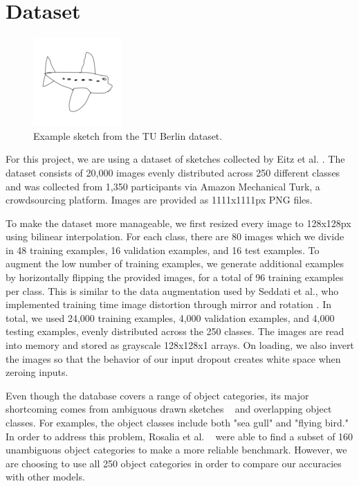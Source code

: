 \documentclass[10pt,twocolumn,letterpaper]{article}
\begin{document}
\section{Dataset}
\begin{figure}[h]
	\begin{center}
	\includegraphics[width=0.5\linewidth]{airplane}
	\caption{Example sketch from the TU Berlin dataset.}
	\end{center}
\end{figure}

For this project, we are using a dataset of sketches collected by Eitz et al. \cite{eitz2012hdhso}. The dataset consists of 20,000 images evenly distributed across 250 different classes and was collected from 1,350 participants via Amazon Mechanical Turk, a crowdsourcing platform. Images are provided as 1111x1111px PNG files.

To make the dataset more manageable, we first resized every image to 128x128px using bilinear interpolation. For each class, there are 80 images which we divide in 48 training examples, 16 validation examples, and 16 test examples. To augment the low number of training examples, we generate additional examples by horizontally flipping the provided images, for a total of 96 training examples per class. This is similar to the data augmentation used by Seddati et al., who implemented training time image distortion through mirror and rotation \cite{seddati2015deepsketch}. In total, we used 24,000 training examples, 4,000 validation examples, and 4,000 testing examples, evenly distributed across the 250 classes. The images are read into memory and stored as grayscale 128x128x1 arrays. On loading, we also invert the images so that the behavior of our input dropout creates white space when zeroing inputs.

Even though the database covers a range of object categories, its major shortcoming comes from ambiguous drawn sketches ~\cite{schneider2014sketch} and overlapping object classes. For examples, the object classes include both "sea gull" and "flying bird." In order to address this problem, Rosalia et al. ~\cite{schneider2014sketch} were able to find a subset of 160 unambiguous object categories to make a more reliable benchmark. However, we are choosing to use all 250 object categories in order to compare our accuracies with other models. 
 
\end{document}
